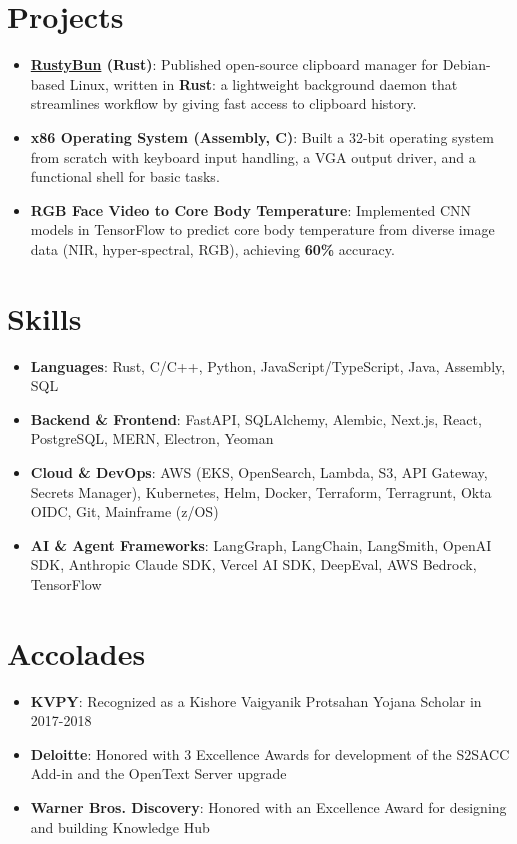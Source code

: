 \documentclass[letterpaper,9pt]{extarticle}
\newcommand{\resumeSubItem}[2]{
  \item\small{
    \textbf{#1}{: #2}
  }\vspace{-2pt}
}
\newcommand{\resumeSubHeadingListStart}{\begin{itemize}[leftmargin=*]}
\newcommand{\resumeSubHeadingListEnd}{\end{itemize}}
\begin{document}
\section{Projects}
    \resumeSubHeadingListStart
        \resumeSubItem{\href{https://github.com/RiturajKulshresth/RustyBun}{RustyBun} (Rust)}
            {Published open-source clipboard manager for Debian-based Linux, written in \textbf{Rust}: a lightweight background daemon that streamlines workflow by giving fast access to clipboard history.}
        \resumeSubItem{x86 Operating System (Assembly, C)}
            {Built a 32-bit operating system from scratch with keyboard input handling, a VGA output driver, and a functional shell for basic tasks.}
        \resumeSubItem{RGB Face Video to Core Body Temperature}
            {Implemented CNN models in TensorFlow to predict core body temperature from diverse image data (NIR, hyper-spectral, RGB), achieving \textbf{60\%} accuracy.}
    \resumeSubHeadingListEnd

\section{Skills}
    \resumeSubHeadingListStart
        \resumeSubItem
            {Languages} {Rust, C/C++, Python, JavaScript/TypeScript, Java, Assembly, SQL}
        \resumeSubItem
            {Backend \& Frontend} {FastAPI, SQLAlchemy, Alembic, Next.js, React, PostgreSQL, MERN, Electron, Yeoman}
        \resumeSubItem
            {Cloud \& DevOps} {AWS (EKS, OpenSearch, Lambda, S3, API Gateway, Secrets Manager), Kubernetes, Helm, Docker, Terraform, Terragrunt, Okta OIDC, Git, Mainframe (z/OS)}
        \resumeSubItem
            {AI \& Agent Frameworks} {LangGraph, LangChain, LangSmith, OpenAI SDK, Anthropic Claude SDK, Vercel AI SDK, DeepEval, AWS Bedrock, TensorFlow}
 \resumeSubHeadingListEnd

 \section{Accolades}
  \resumeSubHeadingListStart
      \resumeSubItem{KVPY}
      {Recognized as a Kishore Vaigyanik Protsahan Yojana Scholar in 2017-2018}
    \resumeSubItem{Deloitte}
      {Honored with 3 Excellence Awards for development of the S2SACC Add-in and the OpenText Server upgrade}
    \resumeSubItem{Warner Bros. Discovery}
      {Honored with an Excellence Award for designing and building Knowledge Hub}
  \resumeSubHeadingListEnd
\end{document}
